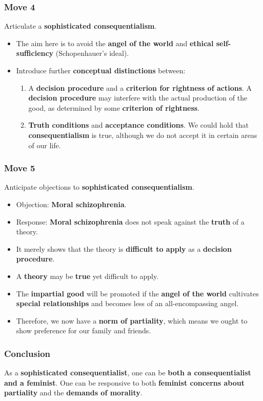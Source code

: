 \documentclass[11pt]{article}
\begin{document}
\subsubsection{Move 4}
\label{sec:orga8faab0}
Articulate a \textbf{sophisticated consequentialism}.
\begin{itemize}
\item The aim here is to avoid the \textbf{angel of the world} and \textbf{ethical self-sufficiency} (Schopenhauer's ideal).
\item Introduce further \textbf{conceptual distinctions} between:
\begin{enumerate}
\item A \textbf{decision procedure} and a \textbf{criterion for rightness of actions}.
A \textbf{decision procedure} may interfere with the actual production of the good, as determined by some \textbf{criterion of rightness}.
\item \textbf{Truth conditions} and \textbf{acceptance conditions}.
We could hold that \textbf{consequentialism} is true, although we do not accept it in certain areas of our life.
\end{enumerate}
\end{itemize}
\subsubsection{Move 5}
\label{sec:org81e67b5}
Anticipate objections to \textbf{sophisticated consequentialism}.
\begin{itemize}
\item Objection: \textbf{Moral schizophrenia}.
\item Response: \textbf{Moral schizophrenia} does not speak against the \textbf{truth} of a theory.
\item It merely shows that the theory is \textbf{difficult to apply} as a \textbf{decision procedure}.
\item A \textbf{theory} may be \textbf{true} yet difficult to apply.
\item The \textbf{impartial good} will be promoted if the \textbf{angel of the world} cultivates \textbf{special relationships} and becomes less of an all-encompassing angel.
\item Therefore, we now have a \textbf{norm of partiality}, which means we ought to show preference for our family and friends.
\end{itemize}
\subsubsection{Conclusion}
\label{sec:orgd53207c}
As a \textbf{sophisticated consequentialist}, one can be \textbf{both a consequentialist and a feminist}. One can be responsive to both \textbf{feminist concerns about partiality} and the \textbf{demands of morality}.
\end{document}

